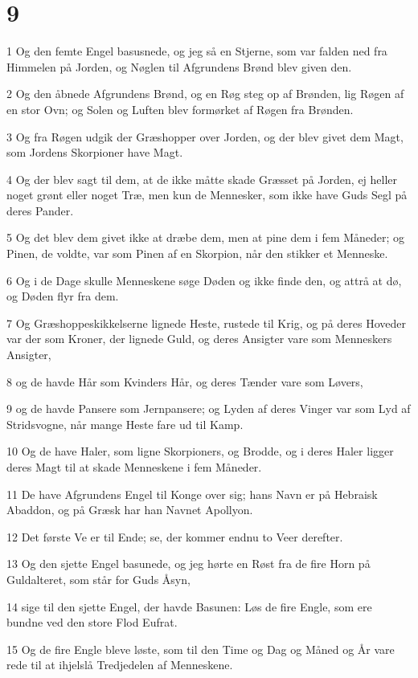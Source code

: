 \chapter{9}

\par 1 Og den femte Engel basusnede, og jeg så en Stjerne, som var falden ned fra Himmelen på Jorden, og Nøglen til Afgrundens Brønd blev given den.
\par 2 Og den åbnede Afgrundens Brønd, og en Røg steg op af Brønden, lig Røgen af en stor Ovn; og Solen og Luften blev formørket af Røgen fra Brønden.
\par 3 Og fra Røgen udgik der Græshopper over Jorden, og der blev givet dem Magt, som Jordens Skorpioner have Magt.
\par 4 Og der blev sagt til dem, at de ikke måtte skade Græsset på Jorden, ej heller noget grønt eller noget Træ, men kun de Mennesker, som ikke have Guds Segl på deres Pander.
\par 5 Og det blev dem givet ikke at dræbe dem, men at pine dem i fem Måneder; og Pinen, de voldte, var som Pinen af en Skorpion, når den stikker et Menneske.
\par 6 Og i de Dage skulle Menneskene søge Døden og ikke finde den, og attrå at dø, og Døden flyr fra dem.
\par 7 Og Græshoppeskikkelserne lignede Heste, rustede til Krig, og på deres Hoveder var der som Kroner, der lignede Guld, og deres Ansigter vare som Menneskers Ansigter,
\par 8 og de havde Hår som Kvinders Hår, og deres Tænder vare som Løvers,
\par 9 og de havde Pansere som Jernpansere; og Lyden af deres Vinger var som Lyd af Stridsvogne, når mange Heste fare ud til Kamp.
\par 10 Og de have Haler, som ligne Skorpioners, og Brodde, og i deres Haler ligger deres Magt til at skade Menneskene i fem Måneder.
\par 11 De have Afgrundens Engel til Konge over sig; hans Navn er på Hebraisk Abaddon, og på Græsk har han Navnet Apollyon.
\par 12 Det første Ve er til Ende; se, der kommer endnu to Veer derefter.
\par 13 Og den sjette Engel basunede, og jeg hørte en Røst fra de fire Horn på Guldalteret, som står for Guds Åsyn,
\par 14 sige til den sjette Engel, der havde Basunen: Løs de fire Engle, som ere bundne ved den store Flod Eufrat.
\par 15 Og de fire Engle bleve løste, som til den Time og Dag og Måned og År vare rede til at ihjelslå Tredjedelen af Menneskene.
